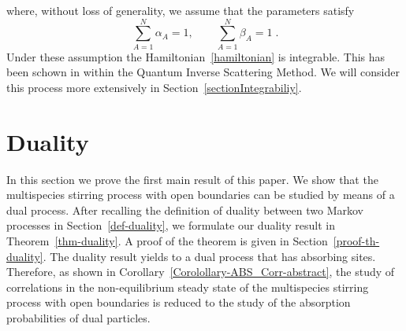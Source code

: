 \documentclass[10pt]{article}
\numberwithin{equation}{section}
\numberwithin{equation}{subsection}
\begin{document}
where, without loss of generality,  we assume that the parameters satisfy
\begin{equation}\label{ratesConditions}
	\sum_{A=1}^{N}\alpha_{A}=1,\qquad\sum_{A=1}^{N}\beta_{A}=1\;.
\end{equation} 
Under these assumption the Hamiltonian~\ref{hamiltonian} is integrable. This has been schown in \cite{vanicat2017exact} within  the Quantum Inverse Scattering Method.  We will consider this process more extensively in Section~\ref{sectionIntegrabiliy}.

\section{Duality}\label{sectionDuality}
In this section we prove the first main result of this paper. We show that the multispecies stirring process with open boundaries
can be studied by means of a dual process. After recalling the definition of duality between two
Markov processes in Section~\ref{def-duality}, we formulate our duality result  in Theorem~\ref{thm-duality}. A proof of the theorem is given in Section~\ref{proof-th-duality}.
The duality result yields {to a dual process that} %
 has absorbing sites. Therefore, as shown in Corollary~\ref{Corolollary-ABS_Corr-abstract}, the study of correlations in the non-equilibrium steady state of the multispecies stirring process with open boundaries
is reduced to the study of the absorption probabilities of dual particles.
\end{document}
